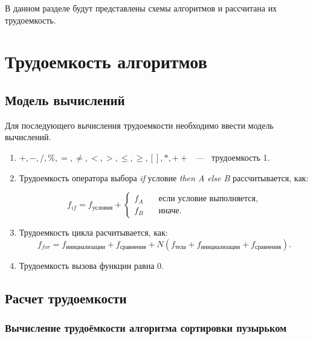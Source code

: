 \documentclass[a4paper,14pt, unknownkeysallowed]{extreport}
\begin{document}
В данном разделе будут представлены схемы алгоритмов и рассчитана их трудоемкость.

\section{Трудоемкость алгоритмов}

\subsection{Модель вычислений}

Для последующего вычисления трудоемкости необходимо ввести модель вычислений.

\begin{enumerate}
    \item $+, -, /, \%, =, \neq, <, >, \leq, \geq, [ ], *, ++$ ~---~ трудоемкость 1.
    \item Трудоемкость оператора выбора \textit{if} условие \textit{then A else B} рассчитывается, как: 
    
    \begin{equation}
        f_{if} = f_{условия} + \begin{cases}
                                f_A & \quad \text{если условие выполняется,} \\
                                f_B & \quad \text{иначе}.
                                \end{cases}
    \end{equation}

    \item Трудоемкость цикла расчитывается, как:
    \begin{equation}
        f_{for} = f_{инициализации} + f_{сравнения} + N(f_{тела} + f_{инициализации} + f_{сравнения}).
    \end{equation}

    \item Трудоемкость вызова функции равна 0.
\end{enumerate}

\subsection{Расчет трудоемкости}

\subsubsection{Вычисление трудоёмкости алгоритма сортировки пузырьком}
\end{document}
